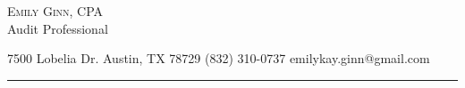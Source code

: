 \documentclass[10pt,A4]{article}
\newcommand{\cvsection}[1]
{
	\begin{center}
		\LARGE\textcolor{sectcol}{\textsc{#1}}\large
	\end{center}
}
\newcommand{\metasection}[3]
{
\footnotesize{#1} \hspace*{\fill} \footnotesize{#2} \hspace*{\fill} \footnotesize{#3}\\[1pt]
}
\begin{document}
\pagestyle{fancy}	








\vspace{-8pt}
\begin{center}
	\HUGE \textsc{Emily Ginn, CPA} \textcolor{sectcol}\\
	\small Audit Professional
\end{center}



\vspace{6pt}


\metasection{7500 Lobelia Dr. Austin, TX 78729}{(832) 310-0737}{emilykay.ginn@gmail.com}
\vspace{-2pt}
\textcolor{softcol}{\hrule}
\vspace{6pt}

\normalsize

\end{document}
